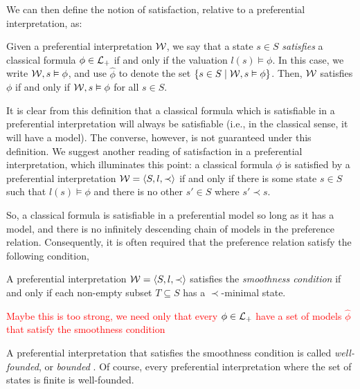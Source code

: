 We can then define the notion of satisfaction, relative to a preferential interpretation, as:

\begin{definition}
	\label{definition:state-satisfaction}

	Given a preferential interpretation $\mathcal{W}$, we say that a state $s \in S$ \emph{satisfies} a classical formula
	$\phi \in \mathcal{L}_+$ if and only if the valuation $l(s) \vDash \phi$. In this case, we write $\mathcal{W}, s \vDash \phi$, and use
	$\hat{\phi}$ to denote the set $\{s \in S \mid \mathcal{W},s \vDash \phi \}$. Then, $\mathcal{W}$ satisfies $\phi$ if and only if $\mathcal{W}
	, s \vDash \phi$ for all $s \in S$.
\end{definition}

It is clear from this definition that a classical formula which is satisfiable in a preferential interpretation will
always be satisfiable (i.e., in the classical sense, it will have a model). The converse, however, is not guaranteed
under this definition. We suggest another reading of satisfaction in a preferential interpretation, which illuminates
this point: a classical formula $\phi$ is satisfied by a preferential interpretation $\mathcal{W} = \langle S,l,\prec \rangle$ if and only if there is some
state $s \in S$ such that $l(s) \vDash \phi$ and there is no other $s'\in S$ where $s' \prec s$.

So, a classical formula is satisfiable in a preferential model so long as it has a model, and there is no infinitely descending
chain of models in the preference relation. Consequently, it is often required that the preference relation satisfy the following
condition,

\begin{definition}
	\label{definition:smoothness} 

	A preferential interpretation $\mathcal{W} = \langle S,l,\prec \rangle$ satisfies the \textit{smoothness condition} if and only if each non-empty subset $T
	\subseteq S$ has a $\prec$-minimal state.
\end{definition}

\textcolor{red}{Maybe this is too strong, we need only that every $\phi \in \mathcal{L}_+$ have a set of models $\hat{\phi}$ that
satisfy the smoothness condition}

A preferential interpretation that satisfies the smoothness condition is called \textit{well-founded}, or \textit{bounded}
\cite{shohamSemanticApproach,lehmann1992what}. Of course, every preferential interpretation where the set of states is finite
is well-founded.

